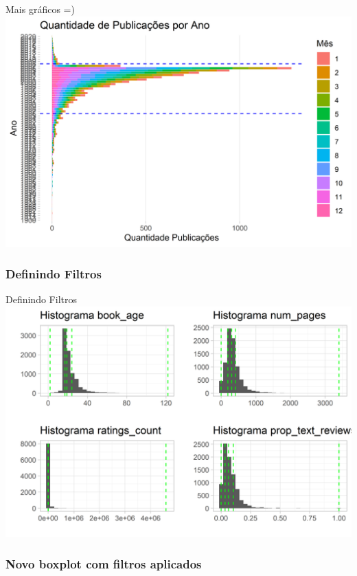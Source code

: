\documentclass[
  9 pt,
  ignorenonframetext,
]{beamer}
\begin{document}
\begin{frame}{Mais gráficos =)}
\includegraphics{apresentacao_files/figure-beamer/unnamed-chunk-9-1.png}
\end{frame}

\hypertarget{definindo-filtros}{%
\subsubsection{Definindo Filtros}\label{definindo-filtros}}

\begin{frame}{Definindo Filtros}
\includegraphics{apresentacao_files/figure-beamer/unnamed-chunk-10-1.png}
\end{frame}

\hypertarget{novo-boxplot-com-filtros-aplicados}{%
\subsubsection{Novo boxplot com filtros
aplicados}\label{novo-boxplot-com-filtros-aplicados}}
\end{document}
